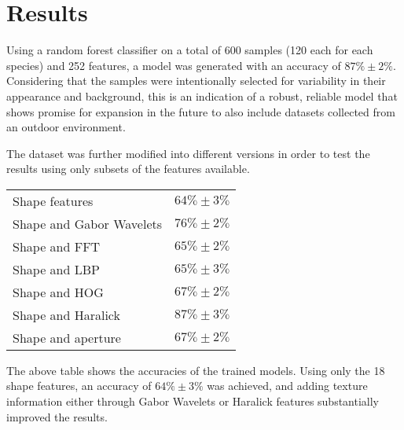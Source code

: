 \section{Results}

Using a random forest classifier on a total of 600 samples (120 each for each species) and 252 features, a model was generated with an accuracy of $87\% \pm 2\%$. Considering that the samples were intentionally selected for variability in their appearance and background, this is an indication of a robust, reliable model that shows promise for expansion in the future to also include datasets collected from an outdoor environment. 

The dataset was further modified into different versions in order to test the results using only subsets of the features available.

\begin{table} 
    \begin{tabular}{ l c }
        Shape features & $64\% \pm 3\%$ \\ 
        Shape and Gabor Wavelets & $76\% \pm 2\%$ \\ 
        Shape and FFT & $65\% \pm 2\%$ \\ 
        Shape and LBP & $65\% \pm 3\%$ \\ 
        Shape and HOG & $67\% \pm 2\%$ \\ 
        Shape and Haralick & $87\% \pm 3\%$ \\ 
        Shape and aperture & $67\% \pm 2\%$ \\ 
    \end{tabular} 
\end{table}

The above table shows the accuracies of the trained models. Using only the 18 shape features, an accuracy of $64\% \pm 3\%$ was achieved, and adding texture information either through Gabor Wavelets or Haralick features substantially improved the results.

  
  
  
  
  
  
  